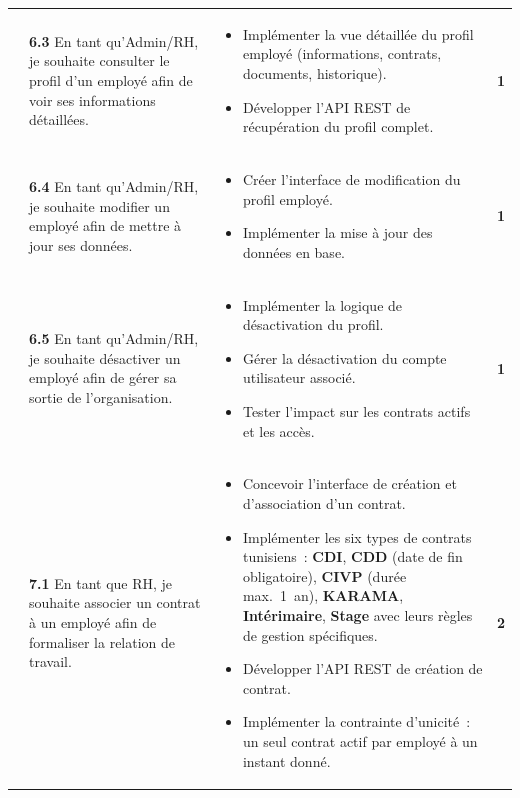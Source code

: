 \begin{small}
\begin{longtable}{|p{2.5cm}|p{6.0cm}|p{6.0cm}|c|}
& \textbf{6.3} En tant qu'Admin/RH, je souhaite consulter le profil
  d'un employé afin de voir ses informations détaillées.
& \begin{itemize}[leftmargin=*, noitemsep, topsep=0pt]
    \item Implémenter la vue détaillée du profil employé (informations,
          contrats, documents, historique).
    \item Développer l'API REST de récupération du profil complet.
  \end{itemize}
& \textbf{1} \\ 

& \textbf{6.4} En tant qu'Admin/RH, je souhaite modifier un employé
  afin de mettre à jour ses données.
& \begin{itemize}[leftmargin=*, noitemsep, topsep=0pt]
    \item Créer l'interface de modification du profil employé.
    \item Implémenter la mise à jour des données en base.
  \end{itemize}
& \textbf{1} \\ 

& \textbf{6.5} En tant qu'Admin/RH, je souhaite désactiver un employé
  afin de gérer sa sortie de l'organisation.
& \begin{itemize}[leftmargin=*, noitemsep, topsep=0pt]
    \item Implémenter la logique de désactivation du profil.
    \item Gérer la désactivation du compte utilisateur associé.
    \item Tester l'impact sur les contrats actifs et les accès.
  \end{itemize}
& \textbf{1} \\ \hline

& \textbf{7.1} En tant que RH, je souhaite associer un contrat à un
  employé afin de formaliser la relation de travail.
& \begin{itemize}[leftmargin=*, noitemsep, topsep=0pt]
    \item Concevoir l'interface de création et d'association d'un contrat.
    \item Implémenter les six types de contrats tunisiens~:
          \textbf{CDI}, \textbf{CDD} (date de fin obligatoire),
          \textbf{CIVP} (durée max.~1~an), \textbf{KARAMA},
          \textbf{Intérimaire}, \textbf{Stage} avec leurs règles de
          gestion spécifiques.
    \item Développer l'API REST de création de contrat.
    \item Implémenter la contrainte d'unicité~: un seul contrat actif
          par employé à un instant donné.
  \end{itemize}
& \textbf{2} \\ 


\end{longtable}
\end{small}
